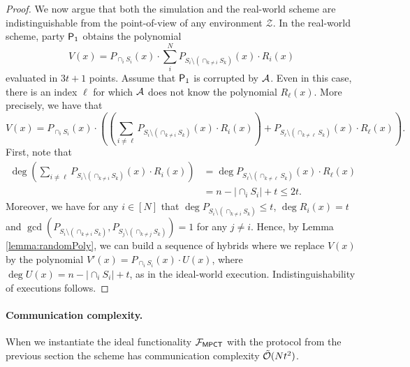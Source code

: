 \begin{proof}
We now argue that both the simulation and the real-world scheme are indistinguishable from the point-of-view of any environment $\mathcal{Z}$. In the real-world scheme, party $\mathsf{P}_1$ obtains the polynomial $$V(x)=P_{\cap_i S_i}(x)\cdot\sum_i^{N} P_{S_i\setminus \left(\cap_{k\neq i} S_k\right)}(x)\cdot R_i(x)$$ evaluated in $3t+1$ points. Assume that $\mathsf{P}_1$ is corrupted by $\mathcal{A}$. Even in this case, there is an  index $\ell$ for which $\mathcal{A}$ does not know the polynomial $R_\ell(x)$. More precisely, we have that $$V(x)=P_{\cap_i S_i}(x)\cdot\left( \left(\sum_{i\neq \ell} P_{S_i\setminus \left(\cap_{k\neq i} S_k\right)}(x)\cdot R_i(x)\right) + P_{S_\ell\setminus \left(\cap_{k\neq \ell} S_k\right)}(x)\cdot R_\ell(x)\right).$$ First, note that \begin{align*}\deg \left(\sum_{i\neq \ell} P_{S_i\setminus \left(\cap_{k\neq i} S_k\right)}(x)\cdot R_i(x)\right) &= \deg P_{S_\ell\setminus \left(\cap_{k\neq \ell} S_k\right)}(x)\cdot R_\ell(x)\\
&=n-|\cap_i S_i|+t\leq 2t.\end{align*} Moreover, we have for any $i\in [N]$ that $\deg P_{S_i\setminus \left(\cap_{k\neq i} S_k\right)}\leq t$, $\deg R_i(x)=t$ and $\gcd\left(P_{S_i\setminus \left(\cap_{k\neq i} S_k\right)}, P_{S_j\setminus \left(\cap_{k\neq j} S_k\right)}\right)=1$ for any $j\neq i$. Hence, by Lemma \ref{lemma:randomPoly}, we can build a sequence of  hybrids where we replace  $V(x)$ by the polynomial $V'(x)=P_{\cap_i S_i}(x)\cdot U(x)$, where $\deg U(x)=n-|\cap_i S_i|+t$, as in the ideal-world execution. 
Indistinguishability of executions follows.
\end{proof}{}


\paragraph{Communication complexity.} 
When we instantiate the ideal functionality $\mathcal{F}_{\mathsf{MPCT}}$ with the protocol from the previous section the scheme has communication complexity $\tilde {\mathcal{O}}(Nt^2)$.
